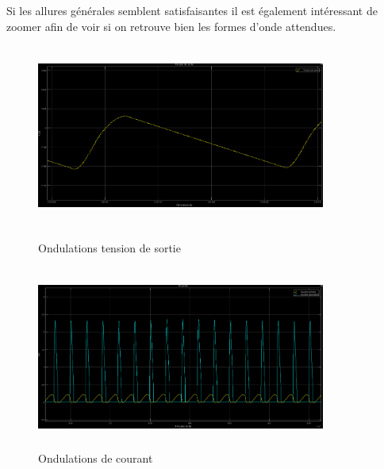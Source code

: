 \documentclass[12pt]{article}
\begin{document}
Si les allures générales semblent satisfaisantes il est également intéressant de zoomer afin de voir si on retrouve bien les formes d'onde attendues.  
  
  
 \vspace{5pt}
 
%
\begin{figure}[!h]
  \hspace{-30pt}
  \vspace{-30pt}
  \begin{minipage}[b]{0.5\linewidth}
 
   \hspace{-20pt}\includegraphics[width=9.5cm,height = 6cm,trim=0cm 0cm 0cm 0cm, clip=true]{Images_rapport/ot}  
   \caption{Ondulations tension de sortie}   
  \end{minipage}
\hfill
  \begin{minipage}[b]{0.5\linewidth}
   \hspace{5pt}
   \includegraphics[width=9.5cm,height = 6cm,trim=0cm 0cm 0cm 0cm, clip=true]{Images_rapport/oc}  
   \caption{Ondulations de courant}   
  \end{minipage}
\end{figure}
 
\end{document}
